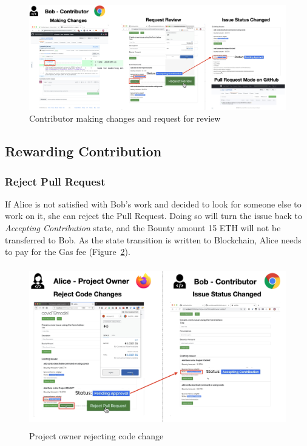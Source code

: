 \documentclass[12pt]{article}
\renewcommand{\_}{\kern-1.5pt\textunderscore\kern-1.5pt}
\begin{document}
\begin{figure}[H]
	\centering
	\includegraphics[width=16cm]{graphs/53. contribute_1.png}
	\caption{Contributor making changes and request for review}
	\label{fig:contribute1}
\end{figure}

\subsection{Rewarding Contribution}

\subsubsection{Reject Pull Request}

If Alice is not satisfied with Bob's work and decided to look for someone else to work on it, she can
reject the Pull Request. Doing so will turn the issue back to \textit{Accepting Contribution} state,
and the Bounty amount 15 ETH will not be transferred to Bob. As the state transition is written to
Blockchain, Alice needs to pay for the Gas fee (Figure~\ref{fig:reward1}).

\begin{figure}[H]
	\centering
	\includegraphics[height=7cm]{graphs/54. reward_1.png}
	\caption{Project owner rejecting code change}
	\label{fig:reward1}
\end{figure}
\end{document}
